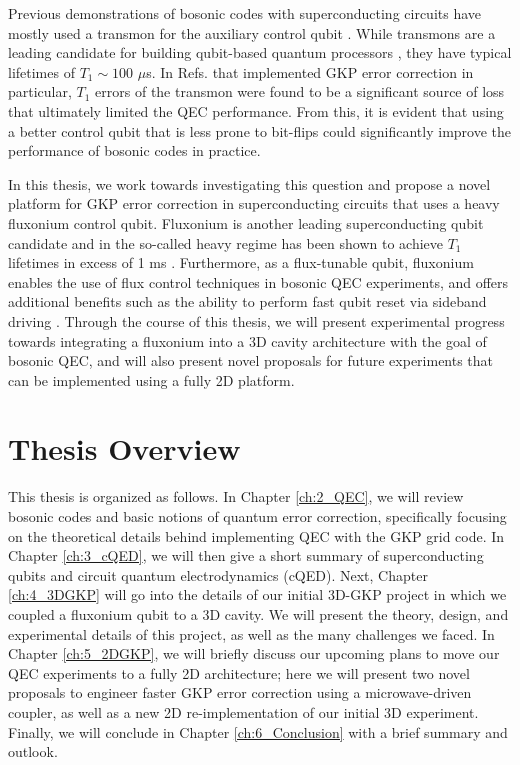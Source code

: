 Previous demonstrations of bosonic codes with superconducting circuits have mostly used a transmon \cite{koch2007charge} for the auxiliary control qubit \cite{ofek2016extending, hu2019quantum, gertler2021protecting, campagne2020gkp-expt, sivak2023gkp-expt, nordquantique2023gkp-expt}. While transmons are a leading candidate for building qubit-based quantum processors \cite{krantz2019quantum, kjaergaard2020superconducting}, they have typical lifetimes of $T_1 \sim 100$ $\mu$s. In Refs. \cite{campagne2020gkp-expt, sivak2023gkp-expt, nordquantique2023gkp-expt} that implemented GKP error correction in particular, $T_1$ errors of the transmon were found to be a significant source of loss that ultimately limited the QEC performance. From this, it is evident that using a better control qubit that is less prone to bit-flips could significantly improve the performance of bosonic codes in practice. 

In this thesis, we work towards investigating this question and propose a novel platform for GKP error correction in superconducting circuits that uses a heavy fluxonium control qubit. Fluxonium is another leading superconducting qubit candidate and in the so-called heavy regime has been shown to achieve $T_1$ lifetimes in excess of 1 ms \cite{earnest2018realization, lin2018demonstration, zhang2021universal, ding2023FTF}. Furthermore, as a flux-tunable qubit, fluxonium enables the use of flux control techniques in bosonic QEC experiments, and offers additional benefits such as the ability to perform fast qubit reset via sideband driving \cite{najera2024high, nie2024parametrically}. Through the course of this thesis, we will present experimental progress towards integrating a fluxonium into a 3D cavity architecture with the goal of bosonic QEC, and will also present novel proposals for future experiments that can be implemented using a fully 2D platform. 

\section{Thesis Overview}
This thesis is organized as follows. In Chapter \ref{ch:2_QEC}, we will review bosonic codes and basic notions of quantum error correction, specifically focusing on the theoretical details behind implementing QEC with the GKP grid code. In Chapter \ref{ch:3_cQED}, we will then give a short summary of superconducting qubits and circuit quantum electrodynamics (cQED). Next, Chapter \ref{ch:4_3DGKP} will go into the details of our initial 3D-GKP project in which we coupled a fluxonium qubit to a 3D cavity. We will present the theory, design, and experimental details of this project, as well as the many challenges we faced. In Chapter \ref{ch:5_2DGKP}, we will briefly discuss our upcoming plans to move our QEC experiments to a fully 2D architecture; here we will present two novel proposals to engineer faster GKP error correction using a microwave-driven coupler, as well as a new 2D re-implementation of our initial 3D experiment. Finally, we will conclude in Chapter \ref{ch:6_Conclusion} with a brief summary and outlook.


